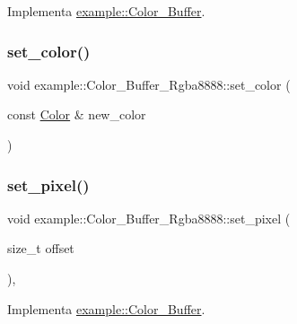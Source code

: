 Implementa \mbox{\hyperlink{classexample_1_1_color___buffer_a3fbfa949ee340ccdb40ad0ce8339b827}{example\+::\+Color\+\_\+\+Buffer}}.

\mbox{\label{classexample_1_1_color___buffer___rgba8888_a5033d0d18293c92936fd2ff5318e3f0f}} 
\subsubsection{\texorpdfstring{set\_color()}{set\_color()}\hspace{0.1cm}{\footnotesize\ttfamily [2/2]}}
{\footnotesize\ttfamily void example\+::\+Color\+\_\+\+Buffer\+\_\+\+Rgba8888\+::set\+\_\+color (\begin{DoxyParamCaption}\item[{const \mbox{\hyperlink{structexample_1_1_color___buffer___rgba8888_1_1_color}{Color}} \&}]{new\+\_\+color }\end{DoxyParamCaption})\hspace{0.3cm}{\ttfamily [inline]}}

\mbox{\label{classexample_1_1_color___buffer___rgba8888_ac741fa7bca9b980a475e6f7033b64347}} 
\subsubsection{\texorpdfstring{set\_pixel()}{set\_pixel()}\hspace{0.1cm}{\footnotesize\ttfamily [1/2]}}
{\footnotesize\ttfamily void example\+::\+Color\+\_\+\+Buffer\+\_\+\+Rgba8888\+::set\+\_\+pixel (\begin{DoxyParamCaption}\item[{size\+\_\+t}]{offset }\end{DoxyParamCaption})\hspace{0.3cm}{\ttfamily [inline]}, {\ttfamily [virtual]}}



Implementa \mbox{\hyperlink{classexample_1_1_color___buffer_a1c919e629ef74e418e1ad416d0a5e85a}{example\+::\+Color\+\_\+\+Buffer}}.

